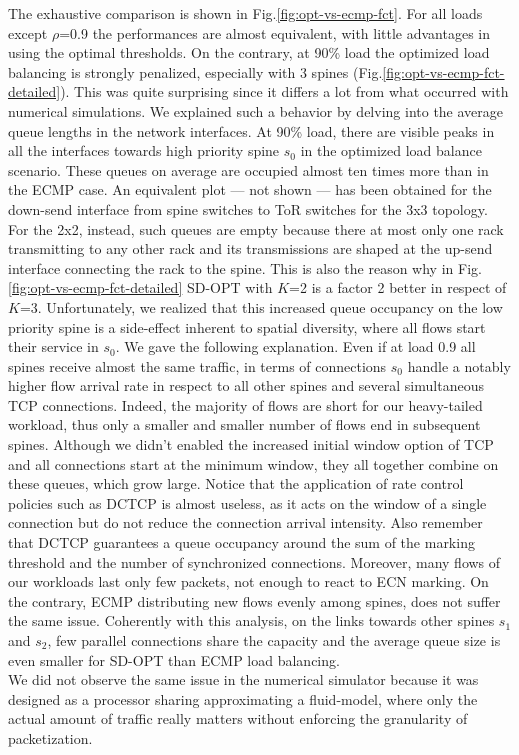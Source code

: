 The exhaustive comparison is shown in Fig.\ref{fig:opt-vs-ecmp-fct}. For all loads except $\rho$=0.9 the performances are almost equivalent, with little advantages in using the optimal thresholds. On the contrary, at 90\% load the optimized load balancing is strongly penalized, especially with 3 spines (Fig.\ref{fig:opt-vs-ecmp-fct-detailed}). This was quite surprising since it differs a lot from what occurred with numerical simulations. We explained such a behavior by delving into the average queue lengths in the network interfaces. At 90\% load, there are visible peaks in all the interfaces towards high priority spine $s_0$ in the optimized load balance scenario. These queues on average are occupied almost ten times more than in the ECMP case. An equivalent plot --- not shown --- has been obtained for the down-send interface from spine switches to ToR switches for the 3x3 topology. For the 2x2, instead, such queues are empty because there at most only one rack transmitting to any other rack and its transmissions are shaped at the up-send interface connecting the rack to the spine. This is also the reason why in Fig. \ref{fig:opt-vs-ecmp-fct-detailed} SD-OPT with $K$=2 is a factor 2 better in respect of $K$=3. Unfortunately, we realized that this increased queue occupancy on the low priority spine is a side-effect inherent to spatial diversity, where all flows start their service in $s_0$. We gave the following explanation. Even if at load 0.9 all spines receive almost the same traffic, in terms of connections $s_0$ handle a notably higher flow arrival rate in respect to all other spines and several simultaneous TCP connections. Indeed, the majority of flows are short for our heavy-tailed workload, thus only a smaller and smaller number of flows end in subsequent spines. Although we didn't enabled the increased initial window option of TCP and all connections start at the minimum window, they all together combine on these queues, which grow large. Notice that the application of rate control policies such as DCTCP is almost useless, as it acts on the window of a single connection but do not reduce the connection arrival intensity. Also remember that DCTCP guarantees a queue occupancy around the sum of the marking threshold and the number of synchronized connections. Moreover, many flows of our workloads last only few packets, not enough to react to ECN marking. On the contrary, ECMP distributing new flows evenly among spines, does not suffer the same issue. Coherently with this analysis, on the links towards other spines $s_1$ and $s_2$, few parallel connections share the capacity and the average queue size is even smaller for SD-OPT than ECMP load balancing. \\
We did not observe the same issue in the numerical simulator because it was designed as a processor sharing approximating a fluid-model, where only the actual amount of traffic really matters without enforcing the granularity of packetization.

